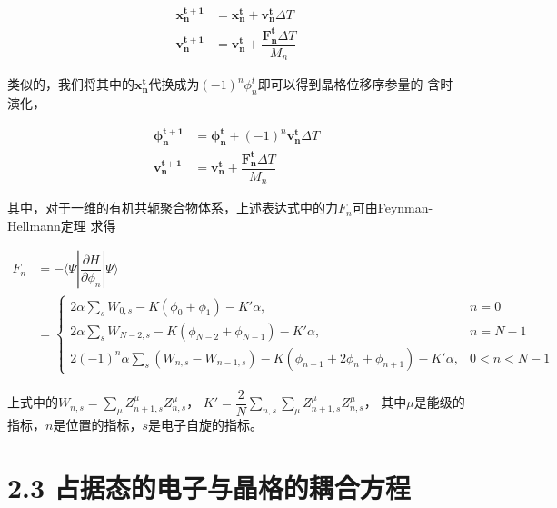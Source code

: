 \documentclass[12pt,]{report}
\begin{document}
\begin{equation}
\begin{aligned}
\bm{x_n^{t+1}} &= \bm{x_n^t} + \bm{v_n^t} \Delta T \\
\bm{v_n^{t+1}} &= \bm{v_n^t} + \dfrac{\bm{F_n^t}\Delta T}{M_n} 
\end{aligned}
\end{equation}

\noindent
类似的，我们将其中的\(\bm{x_n^t}\)代换成为\((-1)^n \phi_n^t\)即可以得到晶格位移序参量的
含时演化，

\begin{equation}
\begin{aligned}
\bm{\phi_n^{t+1}} &= \bm{\phi_n^t} + (-1)^n\bm{v_n^t} \Delta T \\
\bm{v_n^{t+1}} &= \bm{v_n^t} + \dfrac{\bm{F_n^t}\Delta T}{M_n} 
\end{aligned}
\end{equation}

\noindent
其中，对于一维的有机共轭聚合物体系，上述表达式中的力\(F_n\)可由Feynman-Hellmann定理
求得

\begin{equation}
\begin{split}
F_n &= - \langle \Psi | \dfrac{\partial H}{\partial \phi_n} | \Psi \rangle \\
&=
\begin{cases}
2 \alpha \displaystyle \sum\limits_s W_{0,s} - K (\phi_0 + \phi_1) - K' \alpha, & n = 0 \\
2 \alpha \displaystyle \sum\limits_s W_{N-2,s} - K (\phi_{N-2} + \phi_{N-1}) - K' \alpha, & n = N-1 \\
2(-1)^n \alpha \displaystyle \sum\limits_s (W_{n,s}-W_{n-1,s}) - K (\phi_{n-1} + 2 \phi_{n} +
\phi_{n+1}) - K' \alpha, & 0 < n < N-1 
\end{cases}
\end{split}
\end{equation}

\noindent
上式中的\(W_{n,s} = \displaystyle \sum\limits_\mu Z_{n+1,s}^\mu Z_{n,s}^\mu\)，
\(K' = \dfrac{2}{N} \displaystyle \sum\limits_{n,s}\sum\limits_\mu Z_{n+1,s}^\mu Z_{n,s}^\mu\)，
其中\(\mu\)是能级的指标，\(n\)是位置的指标，\(s\)是电子自旋的指标。

\section{2.3
占据态的电子与晶格的耦合方程}\label{ux5360ux636eux6001ux7684ux7535ux5b50ux4e0eux6676ux683cux7684ux8026ux5408ux65b9ux7a0b}
\end{document}
